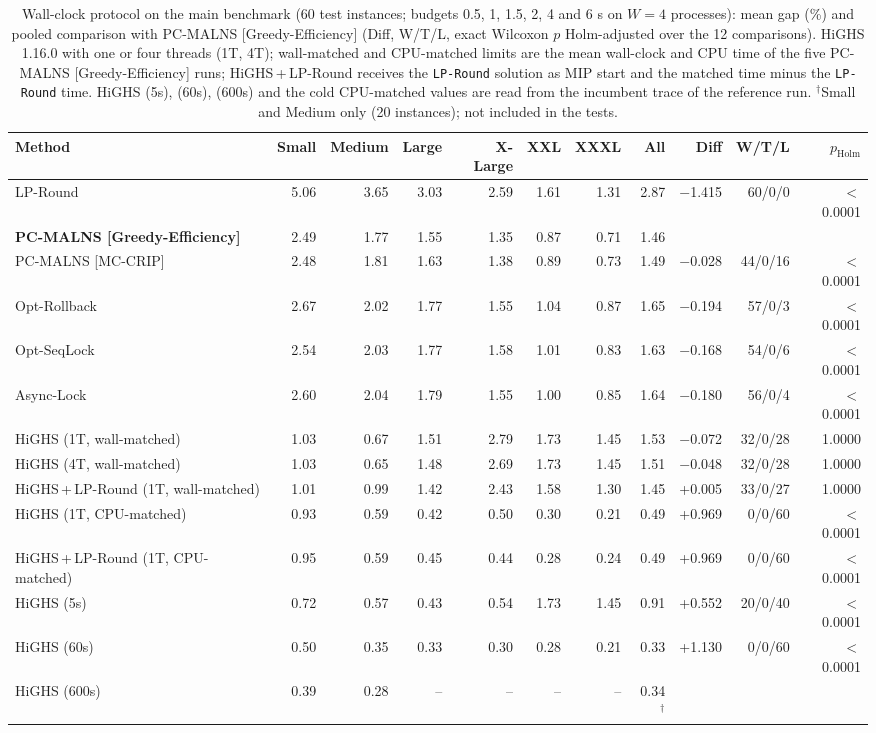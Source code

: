 \begin{table}[pos=!htb]
\centering
\caption{Wall-clock protocol on the main benchmark (60 test instances; budgets 0.5, 1, 1.5, 2, 4 and 6 s on $W = 4$ processes): mean gap (\%) and pooled comparison with PC-MALNS [Greedy-Efficiency] (Diff, W/T/L, exact Wilcoxon $p$ Holm-adjusted over the 12 comparisons). HiGHS 1.16.0 with one or four threads (1T, 4T); wall-matched and CPU-matched limits are the mean wall-clock and CPU time of the five PC-MALNS [Greedy-Efficiency] runs; HiGHS\,+\,LP-Round receives the \texttt{LP-Round} solution as MIP start and the matched time minus the \texttt{LP-Round} time. HiGHS (5s), (60s), (600s) and the cold CPU-matched values are read from the incumbent trace of the reference run. $^{\dagger}$Small and Medium only (20 instances); not included in the tests.}
\label{tab:solver}
\scriptsize
\begin{tabular}{@{}lrrrrrrrrrr@{}}
\toprule
Method & Small & Medium & Large & X-Large & XXL & XXXL & All & Diff & W/T/L & $p_{\text{Holm}}$ \\
\midrule
LP-Round & 5.06 & 3.65 & 3.03 & 2.59 & 1.61 & 1.31 & 2.87 & $-$1.415 & 60/0/0 & $<$0.0001 \\
\textbf{PC-MALNS [Greedy-Efficiency]} & 2.49 & 1.77 & 1.55 & 1.35 & 0.87 & 0.71 & 1.46 &  &  &  \\
PC-MALNS [MC-CRIP] & 2.48 & 1.81 & 1.63 & 1.38 & 0.89 & 0.73 & 1.49 & $-$0.028 & 44/0/16 & $<$0.0001 \\
\addlinespace
Opt-Rollback & 2.67 & 2.02 & 1.77 & 1.55 & 1.04 & 0.87 & 1.65 & $-$0.194 & 57/0/3 & $<$0.0001 \\
Opt-SeqLock & 2.54 & 2.03 & 1.77 & 1.58 & 1.01 & 0.83 & 1.63 & $-$0.168 & 54/0/6 & $<$0.0001 \\
Async-Lock & 2.60 & 2.04 & 1.79 & 1.55 & 1.00 & 0.85 & 1.64 & $-$0.180 & 56/0/4 & $<$0.0001 \\
\addlinespace
HiGHS (1T, wall-matched) & 1.03 & 0.67 & 1.51 & 2.79 & 1.73 & 1.45 & 1.53 & $-$0.072 & 32/0/28 & 1.0000 \\
HiGHS (4T, wall-matched) & 1.03 & 0.65 & 1.48 & 2.69 & 1.73 & 1.45 & 1.51 & $-$0.048 & 32/0/28 & 1.0000 \\
HiGHS\,+\,LP-Round (1T, wall-matched) & 1.01 & 0.99 & 1.42 & 2.43 & 1.58 & 1.30 & 1.45 & +0.005 & 33/0/27 & 1.0000 \\
HiGHS (1T, CPU-matched) & 0.93 & 0.59 & 0.42 & 0.50 & 0.30 & 0.21 & 0.49 & +0.969 & 0/0/60 & $<$0.0001 \\
HiGHS\,+\,LP-Round (1T, CPU-matched) & 0.95 & 0.59 & 0.45 & 0.44 & 0.28 & 0.24 & 0.49 & +0.969 & 0/0/60 & $<$0.0001 \\
HiGHS (5s) & 0.72 & 0.57 & 0.43 & 0.54 & 1.73 & 1.45 & 0.91 & +0.552 & 20/0/40 & $<$0.0001 \\
HiGHS (60s) & 0.50 & 0.35 & 0.33 & 0.30 & 0.28 & 0.21 & 0.33 & +1.130 & 0/0/60 & $<$0.0001 \\
HiGHS (600s) & 0.39 & 0.28 & -- & -- & -- & -- & 0.34$^{\dagger}$ &  &  &  \\
\bottomrule
\end{tabular}
\end{table}
